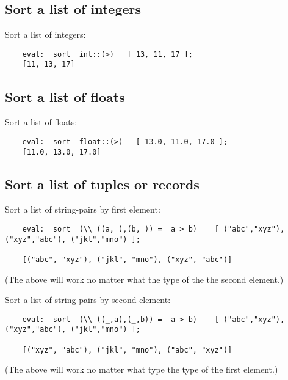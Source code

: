 \cutend*

\subsection{Sort a list of integers}

Sort a list of integers:
\begin{verbatim}
    eval:  sort  int::(>)   [ 13, 11, 17 ];
    [11, 13, 17]
\end{verbatim}

\cutend*

\subsection{Sort a list of floats}

Sort a list of floats:
\begin{verbatim}
    eval:  sort  float::(>)   [ 13.0, 11.0, 17.0 ];
    [11.0, 13.0, 17.0]
\end{verbatim}

\cutend*

\subsection{Sort a list of tuples or records}

Sort a list of string-pairs by first element:
\begin{verbatim}
    eval:  sort  (\\ ((a,_),(b,_)) =  a > b)    [ ("abc","xyz"), ("xyz","abc"), ("jkl","mno") ];

    [("abc", "xyz"), ("jkl", "mno"), ("xyz", "abc")]
\end{verbatim}
(The above will work no matter what the type of the the second element.)

Sort a list of string-pairs by second element:
\begin{verbatim}
    eval:  sort  (\\ ((_,a),(_,b)) =  a > b)    [ ("abc","xyz"), ("xyz","abc"), ("jkl","mno") ];

    [("xyz", "abc"), ("jkl", "mno"), ("abc", "xyz")]
\end{verbatim}
(The above will work no matter what type the type of the first element.)

